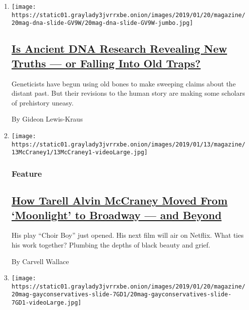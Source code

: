 \begin{enumerate}
\def\labelenumi{\arabic{enumi}.}
\item
  \texttt{[image: https://static01.graylady3jvrrxbe.onion/images/2019/01/20/magazine/20mag-dna-slide-GV9W/20mag-dna-slide-GV9W-jumbo.jpg]}

  \hypertarget{is-ancient-dna-research-revealing-new-truths--or-falling-into-old-traps}{%
  \subsection{\texorpdfstring{\href{/2019/01/17/magazine/ancient-dna-paleogenomics.html}{Is
  Ancient DNA Research Revealing New Truths --- or Falling Into Old
  Traps?}}{Is Ancient DNA Research Revealing New Truths --- or Falling Into Old Traps?}}\label{is-ancient-dna-research-revealing-new-truths--or-falling-into-old-traps}}

  Geneticists have begun using old bones to make sweeping claims about
  the distant past. But their revisions to the human story are making
  some scholars of prehistory uneasy.

  By Gideon Lewis-Kraus
\item
  \texttt{[image: https://static01.graylady3jvrrxbe.onion/images/2019/01/13/magazine/13McCraney1/13McCraney1-videoLarge.jpg]}

  \hypertarget{feature}{%
  \subsubsection{Feature}\label{feature}}

  \hypertarget{how-tarell-alvin-mccraney-moved-from-moonlight-to-broadway--and-beyond}{%
  \subsection{\texorpdfstring{\href{/2019/01/15/magazine/tarell-alvin-mccraney-beauty-black.html}{How
  Tarell Alvin McCraney Moved From `Moonlight' to Broadway --- and
  Beyond}}{How Tarell Alvin McCraney Moved From `Moonlight' to Broadway --- and Beyond}}\label{how-tarell-alvin-mccraney-moved-from-moonlight-to-broadway--and-beyond}}

  His play ``Choir Boy'' just opened. His next film will air on Netflix.
  What ties his work together? Plumbing the depths of black beauty and
  grief.

  By Carvell Wallace
\item
  \texttt{[image: https://static01.graylady3jvrrxbe.onion/images/2019/01/20/magazine/20mag-gayconservatives-slide-7GD1/20mag-gayconservatives-slide-7GD1-videoLarge.jpg]}


\end{enumerate}
